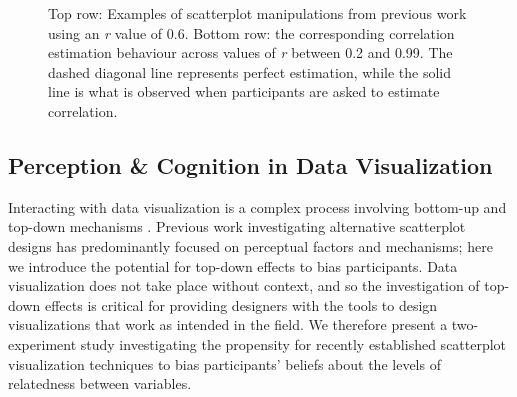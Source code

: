 \documentclass[manuscript,screen,review,anonymous]{acmart}
\begin{document}
\begin{figure}


\caption{\label{fig-previous-manipulations}Top row: Examples of
scatterplot manipulations from previous work using an \textit{r} value
of 0.6. Bottom row: the corresponding correlation estimation behaviour
across values of \textit{r} between 0.2 and 0.99. The dashed diagonal
line represents perfect estimation, while the solid line is what is
observed when participants are asked to estimate correlation.}

\end{figure}%

\subsection{Perception \& Cognition in Data
Visualization}\label{sec-perception-cognition}

Interacting with data visualization is a complex process involving
bottom-up and top-down mechanisms
\citep{shah_2011, franconeri_2021, xiong_2022}. Previous work
investigating alternative scatterplot designs has predominantly focused
on perceptual factors and mechanisms; here we introduce the potential
for top-down effects to bias participants. Data visualization does not
take place without context, and so the investigation of top-down effects
is critical for providing designers with the tools to design
visualizations that work as intended in the field. We therefore present
a two-experiment study investigating the propensity for recently
established scatterplot visualization techniques to bias participants'
beliefs about the levels of relatedness between variables.
\end{document}
